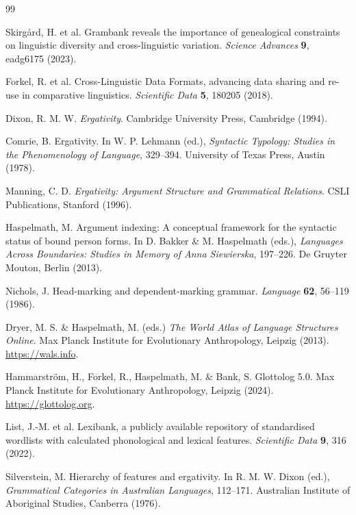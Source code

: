 \documentclass[12pt,a4paper]{article}
\begin{document}
\begin{thebibliography}{99}

Skirg\r{a}rd, H. et al.
Grambank reveals the importance of genealogical constraints on linguistic
diversity and cross-linguistic variation.
\textit{Science Advances} \textbf{9}, eadg6175 (2023).

Forkel, R. et al.
Cross-Linguistic Data Formats, advancing data sharing and re-use in
comparative linguistics.
\textit{Scientific Data} \textbf{5}, 180205 (2018).

Dixon, R. M. W.
\textit{Ergativity}.
Cambridge University Press, Cambridge (1994).

Comrie, B.
Ergativity. In W. P. Lehmann (ed.), \textit{Syntactic Typology: Studies in
the Phenomenology of Language}, 329--394. University of Texas Press, Austin (1978).

Manning, C. D.
\textit{Ergativity: Argument Structure and Grammatical Relations}.
CSLI Publications, Stanford (1996).

Haspelmath, M.
Argument indexing: A conceptual framework for the syntactic status of bound
person forms. In D. Bakker \& M. Haspelmath (eds.), \textit{Languages Across
Boundaries: Studies in Memory of Anna Siewierska}, 197--226. De Gruyter
Mouton, Berlin (2013).

Nichols, J.
Head-marking and dependent-marking grammar.
\textit{Language} \textbf{62}, 56--119 (1986).

Dryer, M. S. \& Haspelmath, M. (eds.)
\textit{The World Atlas of Language Structures Online}.
Max Planck Institute for Evolutionary Anthropology, Leipzig (2013).
\url{https://wals.info}.

Hammarstr\"{o}m, H., Forkel, R., Haspelmath, M. \& Bank, S.
Glottolog 5.0.
Max Planck Institute for Evolutionary Anthropology, Leipzig (2024).
\url{https://glottolog.org}.

List, J.-M. et al.
Lexibank, a publicly available repository of standardised wordlists with
calculated phonological and lexical features.
\textit{Scientific Data} \textbf{9}, 316 (2022).

Silverstein, M.
Hierarchy of features and ergativity. In R. M. W. Dixon (ed.),
\textit{Grammatical Categories in Australian Languages}, 112--171.
Australian Institute of Aboriginal Studies, Canberra (1976).


\end{thebibliography}
\end{document}
